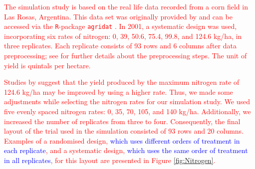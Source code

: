 \documentclass[a4paper]{article} 	%
\newcommand{\revision}[1]{\textcolor{red}{#1}}
\newcommand{\zc}[1]{\textcolor{blue}{#1}}
\begin{document}


\revision{The simulation study is based on the real life data recorded from a corn field in Las Rosas, Argentina. This data set was originally provided by \textcite{Luc2004ASpatial} and can be accessed via the \texttt{R}-package \texttt{agridat} \parencite{White2008Agridat}. In 2001, a systematic design was used, incorporating six rates of nitrogen: 0, 39, 50.6, 75.4, 99.8, and 124.6 kg/ha, in three replicates. Each replicate consists of 93 rows and 6 columns after data preprocessing; see \textcite{Rakshit2020Novel} for further details about the preprocessing steps. The unit of yield is quintals per hectare.} 

\revision{Studies by \textcite{Rakshit2020Novel, Cao2022Bayesian} suggest that the yield produced by the maximum nitrogen rate of 124.6 kg/ha may be improved by using a higher rate. Thus, we made some adjustments while selecting the nitrogen rates for our simulation study. We used five evenly spaced nitrogen rates: 0, 35, 70, 105, and 140 kg/ha. Additionally, we increased the number of replicates from three to four. Consequently, the final layout of the trial used in the simulation consisted of 93 rows and 20 columns. Examples of a randomised design, \zc{which uses different orders of treatment in each replicate}, and a systematic design, \zc{which uses the same order of treatment in all replicates}, for this layout are presented in Figure \ref{fig:Nitrogen}.} 
\end{document}
